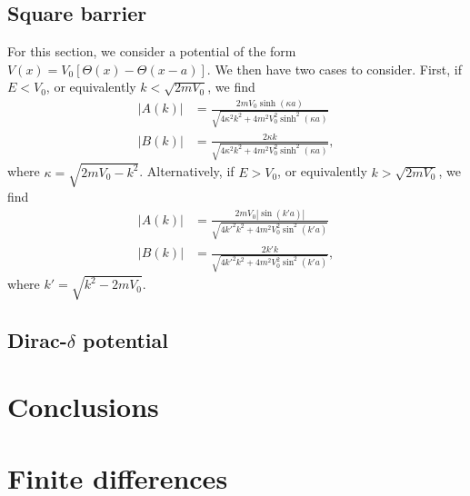\subsection{Square barrier}
\label{ssec:square-barrier}

For this section, we consider a potential of the form $V(x) = V_0 [ \Theta(x) - \Theta(x - a) ]$.
We then have two cases to consider.
First, if $E < V_0$, or equivalently $k < \sqrt{2 m V_0}$, we find
\begin{align}
    |A(k)| &= \frac{2 m V_0 \sinh(\kappa a)}{\sqrt{4 \kappa^2 k^2 + 4 m^2 V_0^2 \sinh^2(\kappa a)}} \\
    |B(k)| &= \frac{2 \kappa k}{\sqrt{4 \kappa^2 k^2 + 4 m^2 V_0^2 \sinh^2(\kappa a)}}
,\end{align}
where $\kappa = \sqrt{2 m V_0 - k^2}$.
Alternatively, if $E > V_0$, or equivalently $k > \sqrt{2 m V_0}$, we find
\begin{align}
    |A(k)| &= \frac{2 m V_0 |\sin(k' a)|}{\sqrt{4 k'^2 k^2 + 4 m^2 V_0^2 \sin^2(k' a)}} \\
    |B(k)| &= \frac{2 k' k}{\sqrt{4 k'^2 k^2 + 4 m^2 V_0^2 \sin^2(k' a)}}
,\end{align}
where $k' = \sqrt{k^2 - 2 m V_0}$.


\subsection{Dirac-$\delta$ potential}



\section{Conclusions}
\label{sec:conclusions}




\appendix

\section{Finite differences}
\label{app:finite-differences}

